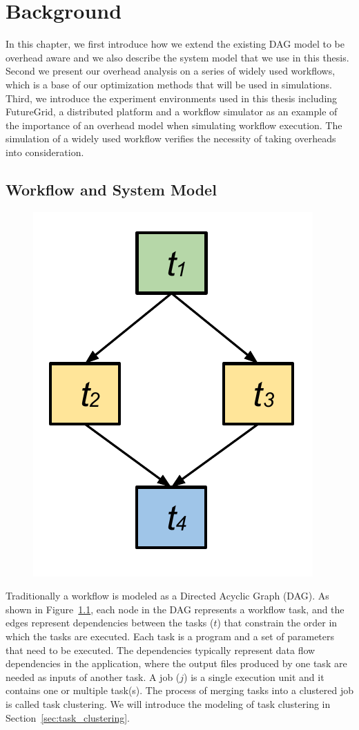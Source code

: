 \chapter{Background}
\label{chap:model}

In this chapter, we first introduce how we extend the existing DAG model to be overhead aware and we also describe the system model that we use in this thesis. Second we present our overhead analysis on a series of widely used workflows, which is a base of our optimization methods that will be used in simulations. Third, we introduce the experiment environments used in this thesis including FutureGrid, a distributed platform and a workflow simulator as an example of the importance of an overhead model when simulating workflow execution. The simulation of a widely used workflow verifies the necessity of taking overheads into consideration. 
\section{Workflow and System Model}

\begin{figure}[h!]
\includegraphics[width=0.3\linewidth]{figures/model/dag.pdf}
\centering
  \label{fig:model_dag}
\end{figure}

Traditionally a workflow is modeled as a Directed Acyclic Graph (DAG). As shown in Figure~\ref{fig:model_dag}, each node in the DAG represents a workflow task, and the edges represent dependencies between the tasks ($t$) that constrain the order in which the tasks are executed. Each task is a program and a set of parameters that need to be executed. 
 The dependencies typically represent data flow dependencies in the application, where the output files produced by one task are needed as inputs of another task. 
A job ($j$) is a single execution unit and it contains one or multiple task(s). The process of merging tasks into a clustered job is called task clustering. We will introduce the modeling of task clustering in Section~\ref{sec:task_clustering}. 

